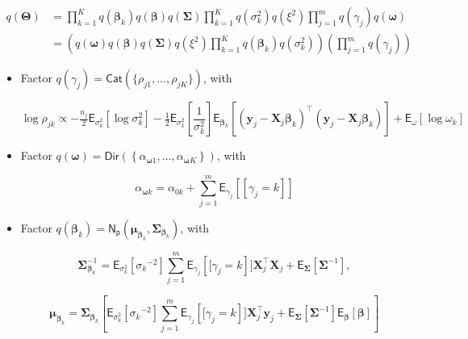 \begin{equation}
\label{Q_CHLRM}
\begin{split}
q(\bm{\Theta})&=\prod_{k=1}^{K}q(\bm{\beta}_k)q(\bm{\beta})q(\bm{\Sigma})\prod_{k=1}^{K}q(\sigma_k^2)q(\xi^2)\prod_{j=1}^{m}q(\gamma_j)q(\bm{\omega})\\
&= \left(q(\bm{\omega})q(\bm{\beta})q(\bm{\Sigma})q(\xi^2)\prod_{k=1}^{K}q(\bm{\beta}_k)q(\sigma_k^2)\right)\left(\prod_{j=1}^{m}q(\gamma_j)\right)
\end{split}
\end{equation}

\begin{itemize}
    \item Factor  $q(\gamma_j)=\mathsf{Cat}(\lbrace{\rho_{j1},\dots,\rho_{jK}\rbrace})$, with

\begin{equation}
\label{CHLRM_CAVI_rhojk_gamma}
\log \rho_{jk} \propto -\tfrac{n_j}{2}\mathsf{E}_{\sigma^2_k}\left[\log\sigma^2_{k}\right]
-\tfrac{1}{2}\mathsf{E}_{\sigma^2_k}\left[\frac{1}{\sigma^2_{k}}\right]\mathsf{E}_{\bm{\beta}_k}\left[\left(\bm{y}_{j}-\bm{X}_{j}\bm{\beta}_{k}\right)^\top\left(\bm{y}_{j}-\bm{X}_{j}\bm{\beta}_{k}\right)\right]+\mathsf{E}_{\omega}\left[\log\omega_k\right]
\end{equation}

\item Factor $q(\bm{\omega})=\mathsf{Dir}\left(\left\lbrace \alpha_{\bm{\omega}1},\dots,\alpha_{\bm{\omega}K}\right\rbrace\right)$, with

\begin{equation}
    \label{CHLRM_CAVI_Alpha_Omega}
    \alpha_{\bm{\omega}k}=\alpha_{0k}+\sum_{j=1}^{m}\mathsf{E}_{\gamma_j}\left[[\gamma_j=k]\right]
\end{equation}

\item Factor $q(\bm{\beta}_k)=\mathsf{N_p}(\bm{\mu}_{\bm{\beta}_k},\bm{\Sigma}_{\bm{\beta}_k})$, with

\begin{equation}
\label{CHLRM_CAVI_Sigma_Betak}
\bm{\Sigma}_{\bm{\beta}_k}^{-1} = \mathsf{E}_{\sigma^2_k}\left[{\sigma_k}^{-2}\right] \sum_{j=1}^{m}\mathsf{E}_{\gamma_j}\left[[\gamma_j=k\right]]\bm{X}_{j}^\top \bm{X}_{j}  + \mathsf{E}_{\bm{\Sigma}}\left[\bm{\Sigma}^{-1}\right] ,
\end{equation}

\begin{equation}
\label{CHLRM_CAVI_Mu_Betak}
\bm{\mu}_{\bm{\beta}_k}= \bm{\Sigma}_{\bm{\beta}_k}\left[\mathsf{E}_{\sigma^2_k}\left[{\sigma_k}^{-2}\right] \sum_{j=1}^{m}\mathsf{E}_{\gamma_j}\left[[\gamma_j=k\right]]\bm{X}_{j}^\top \bm{y}_{j} + \mathsf{E}_{\bm{\Sigma}}\left[\bm{\Sigma}^{-1}\right] \mathsf{E}_{\bm{\beta}}\left[\bm{\beta} \right] \right]
\end{equation}


\end{itemize}
